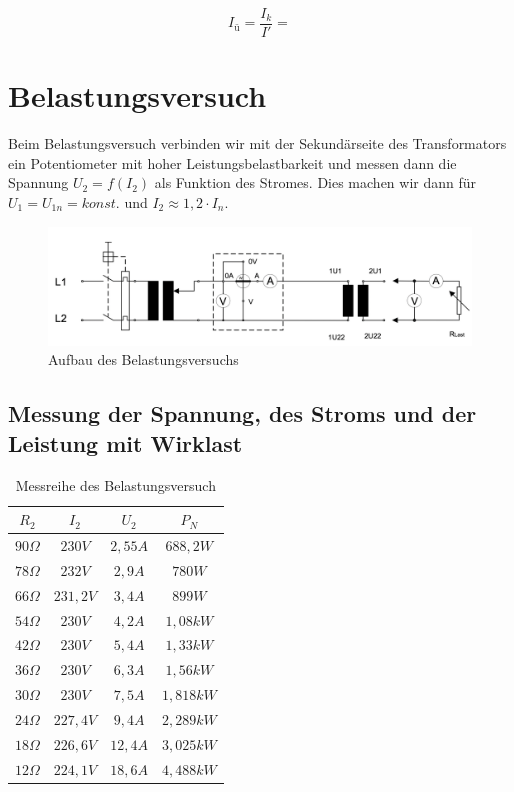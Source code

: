 \documentclass{article}
\begin{document}
\begin{equation*}
  I_{ü} = \frac{I_{k}}{I'} =
\end{equation*}

\section{Belastungsversuch}
\label{sec:belastungsversuch}

Beim Belastungsversuch verbinden wir mit der Sekundärseite des Transformators ein Potentiometer mit hoher Leistungsbelastbarkeit und messen dann die Spannung $U_{2} = f(I_{2})$ als Funktion des Stromes. Dies machen wir dann für $U_{1} = U_{1n} = konst.$ und $I_{2} \approx 1,2 \cdot I_{n}$.
\begin{figure}[h]
  \centering
  \includegraphics[width=\textwidth]{../assets/images/gep3/belastung_aufbau.png}
  \caption{Aufbau des Belastungsversuchs}
  \label{fig:belastaufbau}
\end{figure}
\subsection{Messung der Spannung, des Stroms und der Leistung mit Wirklast}
\label{sec:messung-der-spannung}


\begin{table}[h]
  \centering
  \begin{tabular}{|c|c|c|c|}
    \hline
    $R_{2}$ & $I_{2}$ & $U_{2}$ & $P_{N}$ \\
    \hline
    $90\Omega$ & $230V$ & $2,55A$ & $688,2W$\\
    \hline
    $78\Omega$ & $232V$ & $2,9A$ & $780W$\\
    \hline
    $66\Omega$ & $231,2V$ & $3,4A$ & $899W$\\
    \hline
    $54\Omega$ & $230V$ & $4,2A$ & $1,08kW$\\
    \hline
    $42\Omega$ & $230V$ & $5,4A$ & $1,33kW$\\
    \hline
    $36\Omega$ & $230V$ & $6,3A$ & $1,56kW$ \\
    \hline
    $30\Omega$ & $230V$ & $7,5A$ & $1,818kW$ \\
    \hline
    $24\Omega$ & $227,4V$ & $9,4A$ & $2,289kW$ \\
    \hline
    $18\Omega$ & $226,6V$ & $12,4A$ & $3,025kW$ \\
    \hline
    $12\Omega$ & $224,1V$ & $18,6A$ & $4,488kW$\\
    \hline
  \end{tabular}
  \caption{Messreihe des Belastungsversuch}
  \label{tab:messbelast}
\end{table}
\end{document}
